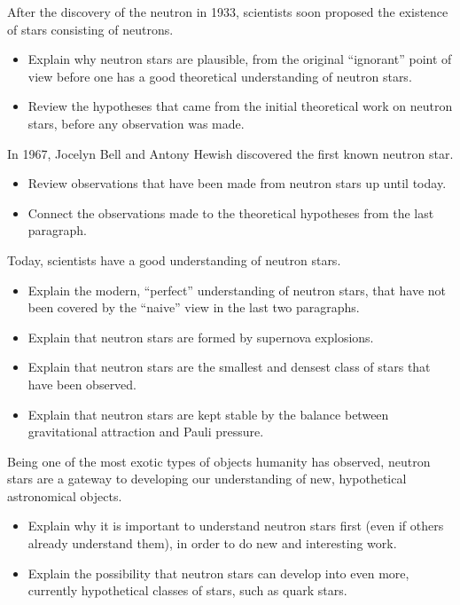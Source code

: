 After the discovery of the neutron in 1933, scientists soon proposed the existence of stars consisting of neutrons.
\begin{itemize}
\item Explain why neutron stars are plausible, from the original ``ignorant'' point of view before one has a good theoretical understanding of neutron stars.
\item Review the hypotheses that came from the initial theoretical work on neutron stars, before any observation was made.
\end{itemize}

In 1967, Jocelyn Bell and Antony Hewish discovered the first known neutron star.
\begin{itemize}
\item Review observations that have been made from neutron stars up until today.
\item Connect the observations made to the theoretical hypotheses from the last paragraph.
\end{itemize}

Today, scientists have a good understanding of neutron stars.
\begin{itemize}
\item Explain the modern, ``perfect'' understanding of neutron stars, that have not been covered by the ``naive'' view in the last two paragraphs.
\item Explain that neutron stars are formed by supernova explosions.
\item Explain that neutron stars are the smallest and densest class of stars that have been observed.
\item Explain that neutron stars are kept stable by the balance between gravitational attraction and Pauli pressure.
\end{itemize}

Being one of the most exotic types of objects humanity has observed, neutron stars are a gateway to developing our understanding of new, hypothetical astronomical objects.
\begin{itemize}
\item Explain why it is important to understand neutron stars first (even if others already understand them), in order to do new and interesting work.
\item Explain the possibility that neutron stars can develop into even more, currently hypothetical classes of stars, such as quark stars.
\end{itemize}

